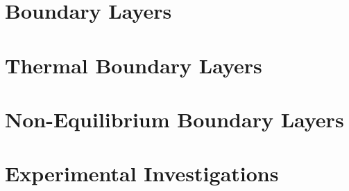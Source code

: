 \section{Boundary Layers}

\section{Thermal Boundary Layers}


\section{Non-Equilibrium Boundary Layers}

\section{Experimental Investigations}
